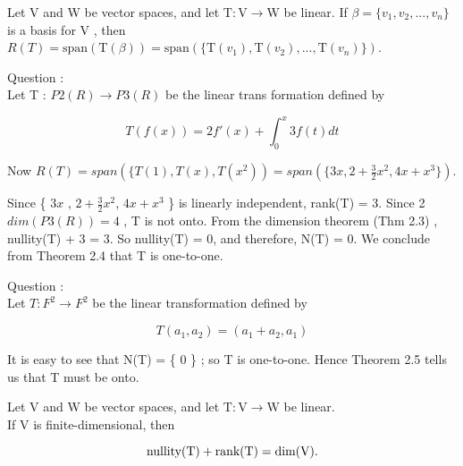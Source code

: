 \begin{thm*}
$ $\\
 Let V and W be vector spaces, and let $\mathrm{T} : \mathrm{V}  \rightarrow \mathrm{W}$ be linear. If $\beta = \{ v_1,v_2,...,v_n \}$ is a basis for $\mathrm{V}$ , then $ R(T) = \mathrm{span}(\mathrm{T}(\beta)) = \mathrm{span}(\{\mathrm{T}(v_1), \mathrm{T}(v_2), . . . , \mathrm{T}(v_n)\})$.

\end{thm*}

\begin{example}[11] %
	Question : \\
	Let T : $P2(R) \rightarrow  P3(R) $ be the linear trans formation defined by 
	
	
	 \[T(f(x)) = 2f'(x) + \int_0^x3 f(t) dt \]
	
		\begin{sol*} 
$ $ \\ 	
Now $R(T) = span( \{ T(1), T(x), T(x^2 )  ) = span( \{ 3x,  2+ \frac{3}{2}  x^2 , 4x + x^3 \} ) $. 

 \noindent Since \{ $3x$ , $ 2 + \frac{3}{2} x^2$, $4x + x^3$ \} is linearly independent, rank(T) = 3. Since
2
$dim(P3(R)) = 4$ , T is not onto. From the dimension theorem (Thm 2.3) , nullity(T) +
3 = 3. So nullity(T) = 0, and therefore, N(T) = {0}. We conclude from Theorem 2.4 that T is one-to-one.

	\end{sol*}

	\end{example}
\begin{example}[12] %
	 Question : \\ Let $T: F^2 \rightarrow F^2 $ be the linear transformation defined by 
	 
	 \[T(a_1, a_2) = (a_1 + a_2, a_1)\]

	\begin{sol*} 
$ $ \\
		It is easy to see that N(T) = \{ 0 \} ; so T is one-to-one. Hence Theorem 2.5 tells us that T must be onto. 
	\end{sol*}

\end{example}

\begin{thm*}
$ $ \\	
Let V and W be vector spaces,
and let $ \mathrm{T} : \mathrm{V}  \rightarrow  \mathrm{W} $ be linear. \\ If V is finite-dimensional, then
 
 
 \[\rm	nullity(T) + rank(T) = dim(V).\]


\end{thm*}

